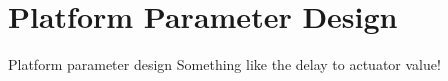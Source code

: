 \section{Platform Parameter Design}

\color{red}
Platform	parameter	design
Something like the delay to actuator value!
\color{black}
